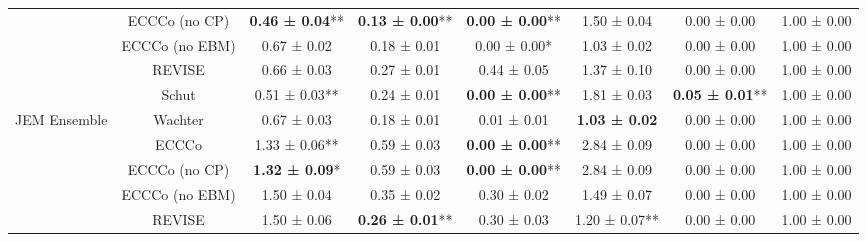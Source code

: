 \begin{table}
{\begin{tabular}[t]{cccccccc}
 & ECCCo (no CP) & \textbf{0.46 ± 0.04}** & \textbf{0.13 ± 0.00}** & \textbf{0.00 ± 0.00}** & 1.50 ± 0.04\hphantom{*}\hphantom{*} & 0.00 ± 0.00\hphantom{*}\hphantom{*} & 1.00 ± 0.00\hphantom{*}\hphantom{*}\\

 & ECCCo (no EBM) & 0.67 ± 0.02\hphantom{*}\hphantom{*} & 0.18 ± 0.01\hphantom{*}\hphantom{*} & 0.00 ± 0.00*\hphantom{*} & 1.03 ± 0.02\hphantom{*}\hphantom{*} & 0.00 ± 0.00\hphantom{*}\hphantom{*} & 1.00 ± 0.00\hphantom{*}\hphantom{*}\\

 & REVISE & 0.66 ± 0.03\hphantom{*}\hphantom{*} & 0.27 ± 0.01\hphantom{*}\hphantom{*} & 0.44 ± 0.05\hphantom{*}\hphantom{*} & 1.37 ± 0.10\hphantom{*}\hphantom{*} & 0.00 ± 0.00\hphantom{*}\hphantom{*} & 1.00 ± 0.00\hphantom{*}\hphantom{*}\\

 & Schut & 0.51 ± 0.03** & 0.24 ± 0.01\hphantom{*}\hphantom{*} & \textbf{0.00 ± 0.00}** & 1.81 ± 0.03\hphantom{*}\hphantom{*} & \textbf{0.05 ± 0.01}** & 1.00 ± 0.00\hphantom{*}\hphantom{*}\\

\multirow[t]{-6}{*}{\centering\arraybackslash JEM Ensemble} & Wachter & 0.67 ± 0.03\hphantom{*}\hphantom{*} & 0.18 ± 0.01\hphantom{*}\hphantom{*} & 0.01 ± 0.01\hphantom{*}\hphantom{*} & \textbf{1.03 ± 0.02}\hphantom{*}\hphantom{*} & 0.00 ± 0.00\hphantom{*}\hphantom{*} & 1.00 ± 0.00\hphantom{*}\hphantom{*}\\
\cmidrule{1-8}
 & ECCCo & 1.33 ± 0.06** & 0.59 ± 0.03\hphantom{*}\hphantom{*} & \textbf{0.00 ± 0.00}** & 2.84 ± 0.09\hphantom{*}\hphantom{*} & 0.00 ± 0.00\hphantom{*}\hphantom{*} & 1.00 ± 0.00\hphantom{*}\hphantom{*}\\

 & ECCCo (no CP) & \textbf{1.32 ± 0.09}*\hphantom{*} & 0.59 ± 0.03\hphantom{*}\hphantom{*} & \textbf{0.00 ± 0.00}** & 2.84 ± 0.09\hphantom{*}\hphantom{*} & 0.00 ± 0.00\hphantom{*}\hphantom{*} & 1.00 ± 0.00\hphantom{*}\hphantom{*}\\

 & ECCCo (no EBM) & 1.50 ± 0.04\hphantom{*}\hphantom{*} & 0.35 ± 0.02\hphantom{*}\hphantom{*} & 0.30 ± 0.02\hphantom{*}\hphantom{*} & 1.49 ± 0.07\hphantom{*}\hphantom{*} & 0.00 ± 0.00\hphantom{*}\hphantom{*} & 1.00 ± 0.00\hphantom{*}\hphantom{*}\\

 & REVISE & 1.50 ± 0.06\hphantom{*}\hphantom{*} & \textbf{0.26 ± 0.01}** & 0.30 ± 0.03\hphantom{*}\hphantom{*} & 1.20 ± 0.07** & 0.00 ± 0.00\hphantom{*}\hphantom{*} & 1.00 ± 0.00\hphantom{*}\hphantom{*}\\


\end{tabular}}
\end{table}
